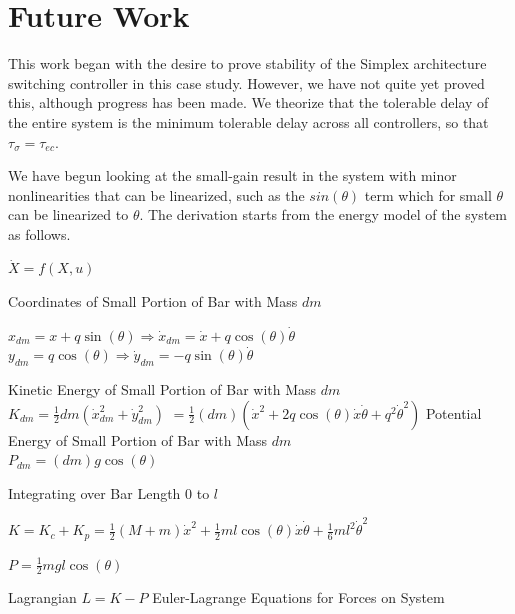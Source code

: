 \documentclass[conference]{IEEEtran}
\begin{document}


\section{Future Work}
This work began with the desire to prove stability of the Simplex architecture switching controller in this case study.  However, we have not quite yet proved this, although progress has been made.  We theorize that the tolerable delay of the entire system is the minimum tolerable delay across all controllers, so that $\tau_{\sigma}=\tau_{ec}$.

We have begun looking at the small-gain result in the system with minor nonlinearities that can be linearized, such as the $sin(\theta)$ term which for small $\theta$ can be linearized to $\theta$.  The derivation starts from the energy model of the system as follows.

$\dot{X}=f\left(X,u\right)$

Coordinates of Small Portion of Bar with Mass $dm$

$x_{dm}=x+q\sin\left(\theta\right)\Rightarrow\dot{x}_{dm}=\dot{x}+q\cos\left(\theta\right)\dot{\theta}$\\$y_{dm}=q\cos\left(\theta\right)\Rightarrow\dot{y}_{dm}=-q\sin\left(\theta\right)\dot{\theta}$

Kinetic Energy of Small Portion of Bar with Mass
$dm$\\$K_{dm}=\frac{1}{2}dm\left(\dot{x}_{dm}^2+\dot{y}_{dm}^2\right)$ $=\frac{1}{2}\left(dm\right)\left(\dot{x}^2+2q\cos\left(\theta\right)\dot{x}\dot{\theta}+q^2\dot{\theta}^2\right)$
Potential Energy of Small Portion of Bar with Mass $dm$\\$P_{dm}=\left(dm\right)g\cos\left(\theta\right)$

Integrating over Bar Length $0$ to $l$

$K=K_c+K_p=\frac{1}{2}\left(M+m\right)\dot{x}^2+\frac{1}{2}ml\cos\left(\theta\right)\dot{x}\dot{\theta}+\frac{1}{6}ml^2\dot{\theta}^2$

$P=\frac{1}{2}mgl\cos\left(\theta\right)$

Lagrangian $L=K-P$
Euler-Lagrange Equations for Forces on System
\end{document}
